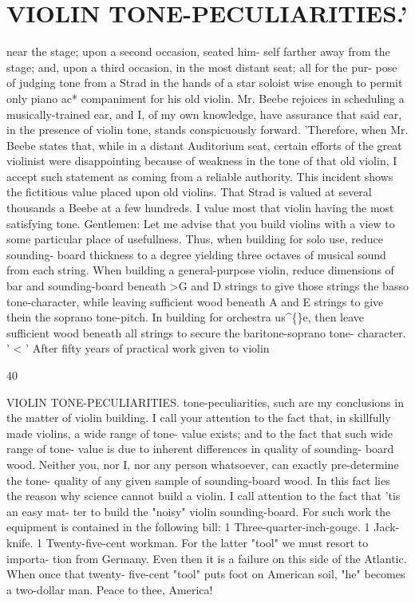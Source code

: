 \documentclass{article}
\begin{document}
\section*{VIOLIN TONE-PECULIARITIES.'}
near the stage; upon a second occasion, seated him- self farther away from the stage; and, upon a third occasion, in the most distant seat; all for the pur- pose of judging tone from a Strad in the hands of a star soloist wise enough to permit only piano ac* companiment for his old violin. Mr. Beebe rejoices in scheduling a musically-trained ear, and I, of my own knowledge, have assurance that said ear, in the presence of violin tone, stands conspicuously forward. 'Therefore, when Mr. Beebe states that, while in a distant Auditorium seat, certain efforts of the great violinist were disappointing because of weakness in the tone of that old violin, I accept such statement as coming from a reliable authority. This incident shows the fictitious value placed upon old violins. That Strad is valued at several thousands a Beebe at a few hundreds. I value most that violin having the most satisfying tone. Gentlemen: Let me advise that you build violins with a view to some particular place of usefullness. Thus, when building for solo use, reduce sounding- board thickness to a degree yielding three octaves of musical sound from each string. When building a general-purpose violin, reduce dimensions of bar and sounding-board beneath >G and D strings to give those strings the basso tone-character, while leaving sufficient wood beneath A and E strings to give thein the soprano tone-pitch. In building for orchestra us\textasciicircum\{\}e, then leave sufficient wood beneath all strings to secure the baritone-soprano tone- character. ' < ' After fifty years of practical work given to violin

40

VIOLIN TONE-PECULIARITIES. tone-peculiarities, such are my conclusions in the matter of violin building. I call your attention to the fact that, in skillfully made violins, a wide range of tone- value exists; and to the fact that such wide range of tone- value is due to inherent differences in quality of sounding- board wood. Neither you, nor I, nor any person whatsoever, can exactly pre-determine the tone- quality of any given sample of sounding-board wood. In this fact lies the reason why science cannot build a violin. I call attention to the fact that 'tis an easy mat- ter to build the "noisy" violin sounding-board. For such work the equipment is contained in the following bill: 1 Three-quarter-inch-gouge. 1 Jack-knife. 1 Twenty-five-cent workman. For the latter "tool" we must resort to importa- tion from Germany. Even then it is a failure on this side of the Atlantic. When once that twenty- five-cent "tool" puts foot on American soil, "he" becomes a two-dollar man. Peace to thee, America!
\end{document}
